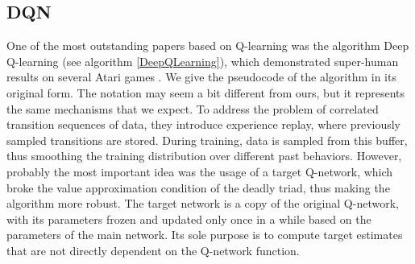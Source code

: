 \subsection*{DQN}
One of the most outstanding papers based on Q-learning was the algorithm Deep Q-learning (see algorithm \ref{DeepQLearning}), which demonstrated super-human results on several Atari games \cite{Atari}.
We give the pseudocode of the algorithm in its original form.
The notation may seem a bit different from ours, but it represents the same mechanisms that we expect.
To address the problem of correlated transition sequences of data, they introduce experience replay, where previously sampled transitions are stored.
During training, data is sampled from this buffer, thus smoothing the training distribution over different past behaviors.
However, probably the most important idea was the usage of a target Q-network, which broke the value approximation condition of the deadly triad, thus making the algorithm more robust.
The target network is a copy of the original Q-network, with its parameters frozen and updated only once in a while based on the parameters of the main network.
Its sole purpose is to compute target estimates that are not directly dependent on the Q-network function.

